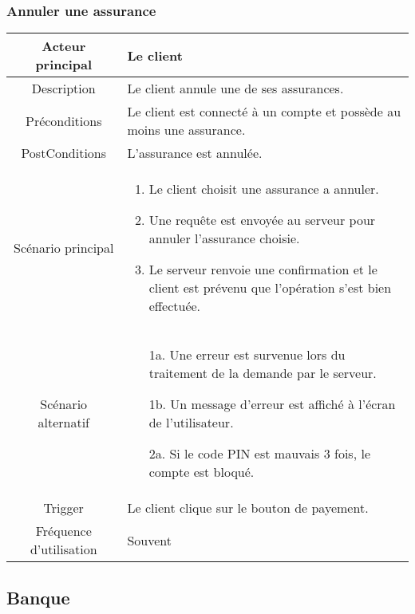 \documentclass{article}
\begin{document}
\subsubsection{Annuler une assurance}
\begin{table}[h]
    \begin{tabular}{|c|p{10cm}|}
       \hline
       Acteur principal&Le client\\
       \hline
       Description&Le client annule une de ses assurances.\\
       \hline
       Préconditions&Le client est connecté à un compte et possède au moins une assurance.\\
       \hline
       PostConditions&L'assurance est annulée.\\
       \hline
       Scénario principal& 
             \begin{enumerate}
                \item Le client choisit une assurance a annuler.
                \item Une requête est envoyée au serveur pour annuler l'assurance choisie.
                \item Le serveur renvoie une confirmation et le client est prévenu que l'opération s'est bien effectuée.
             \end{enumerate}     \\
       \hline
       Scénario alternatif&    
       \begin{itemize}
        \item[1a.] Une erreur est survenue lors du traitement de la demande par le serveur.
        \item[1b.] Un message d'erreur est affiché à l'écran de l'utilisateur. 
        \item[2a.] Si le code PIN est mauvais 3 fois, le compte est bloqué.
        \end{itemize}
       \\
       \hline
       Trigger&Le client clique sur le bouton de payement.\\
       \hline
       Fréquence d'utilisation&Souvent\\
       \hline
    \end{tabular}
 \end{table}



\newpage

\subsection{Banque}
\end{document}
